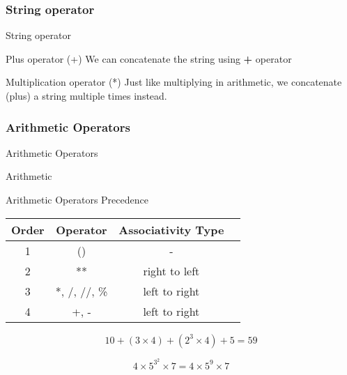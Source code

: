 \documentclass{beamer}
\begin{document}
\subsubsection{String operator}
\begin{frame}{String operator}
    \begin{block}{Plus operator (+)}
        We can concatenate the string using \textbf{+} operator
        
    \end{block}
    \begin{block}{Multiplication operator (*)}
        Just like multiplying in arithmetic, we concatenate (plus) a string multiple times instead.
        
    \end{block}
\end{frame}

\subsubsection{Arithmetic Operators}
\begin{frame}{Arithmetic Operators}
    \begin{block}{Arithmetic}
        
    \end{block}
\end{frame}

\begin{frame}{Arithmetic Operators Precedence}
    \centering
    \begin{tabular}{|c|c|c|c|}
        \hline
        Order & Operator     & Associativity Type \\
        \hline
        1     & ()           & -                  \\
        \hline
        2     & **           & right to left      \\
        \hline
        3     & *, /, //, \% & left to right      \\
        \hline
        4     & +, -         & left to right      \\
        \hline
    \end{tabular}
\end{frame}

\begin{frame}
    \begin{example}
        
        $$
            10 + (3\times4) + (2^3 \times 4) + 5 = 59
        $$
    \end{example}
    \begin{example}
        
        $$
            4 \times 5^{3^2} \times 7 = 4 \times 5^9 \times 7
        $$
    \end{example}
\end{frame}
\end{document}
